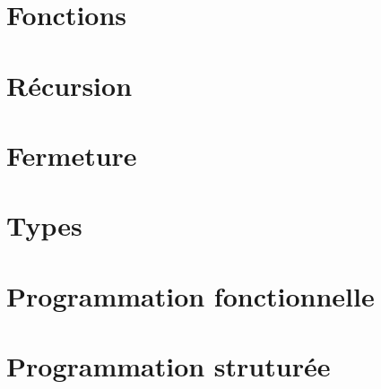 \documentclass[10pt]{scrreprt}
\begin{document}






\chapter{Fonctions}





\chapter{Récursion}


\chapter{Fermeture}




\chapter{Types}





\chapter{Programmation fonctionnelle}















\chapter{Programmation struturée}
\end{document}
